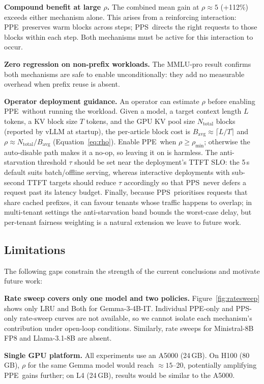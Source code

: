 \documentclass[journal]{IEEEtran}
\newcommand{\ppe}{\textsc{PPE}}
\newcommand{\pps}{\textsc{PPS}}
\newcommand{\rhomin}{\rho_{\min}}
\begin{document}
\textbf{Compound benefit at large $\rho$.}
The combined mean gain at $\rho\approx5$ (+112\%) exceeds either mechanism
alone.  This arises from a reinforcing interaction: \ppe\ preserves warm
blocks across steps; \pps\ directs the right requests to those blocks within
each step.  Both mechanisms must be active for this interaction to occur.

\textbf{Zero regression on non-prefix workloads.}
The MMLU-pro result confirms both mechanisms are safe to enable
unconditionally: they add no measurable overhead when prefix reuse is absent.

\textbf{Operator deployment guidance.}
An operator can estimate $\rho$ before enabling \ppe\ without running the
workload.  Given a model, a target context length $L$ tokens, a KV block size
$T$ tokens, and the GPU KV pool size $N_{\mathrm{total}}$ blocks (reported by
vLLM at startup), the per-article block cost is
$B_{\mathrm{avg}}\approx\lceil L/T\rceil$ and
$\rho \approx N_{\mathrm{total}} / B_{\mathrm{avg}}$ (Equation~\ref{eq:rho}).
Enable \ppe\ when $\rho\geq\rhomin$; otherwise the auto-disable path makes it a
no-op, so leaving it on is harmless.
The anti-starvation threshold $\tau$ should be set near the deployment's TTFT
SLO: the 5\,s default suits batch/offline serving, whereas interactive
deployments with sub-second TTFT targets should reduce $\tau$ accordingly so
that \pps\ never defers a request past its latency budget.
Finally, because \pps\ prioritises requests that share cached prefixes, it can
favour tenants whose traffic happens to overlap; in multi-tenant settings the
anti-starvation band bounds the worst-case delay, but per-tenant fairness
weighting is a natural extension we leave to future work.

\subsection{Limitations}
\label{sec:limitations}

The following gaps constrain the strength of the current conclusions and
motivate future work:

\textbf{Rate sweep covers only one model and two policies.}
Figure~\ref{fig:ratesweep} shows only LRU and Both for Gemma-3-4B-IT.
Individual PPE-only and PPS-only rate-sweep curves are not available, so we
cannot isolate each mechanism's contribution under open-loop conditions.
Similarly, rate sweeps for Ministral-8B FP8 and Llama-3.1-8B are absent.

\textbf{Single GPU platform.}
All experiments use an A5000 (24\,GB).  On H100 (80\,GB), $\rho$ for the same
Gemma model would reach $\approx15$--20, potentially amplifying \ppe\ gains
further; on L4 (24\,GB), results would be similar to the A5000.
\end{document}
